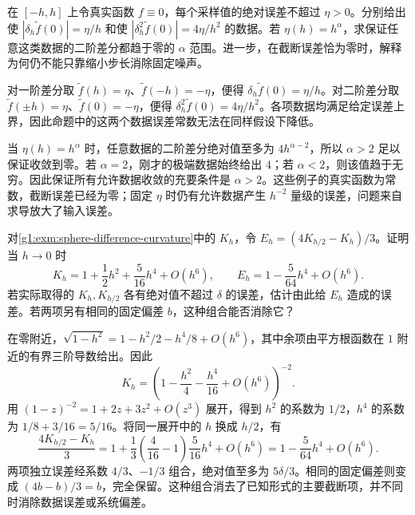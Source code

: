 \begin{exercise}\label{g1:ex:difference-noise-sharpness}
	在 \([-h,h]\) 上令真实函数 \(f\equiv0\)，每个采样值的绝对误差不超过 \(\eta>0\)。分别给出使 \(|\delta_h\widetilde f(0)|=\eta/h\) 和使 \(|\delta_h^2\widetilde f(0)|=4\eta/h^2\) 的数据。若 \(\eta(h)=h^\alpha\)，求保证任意这类数据的二阶差分都趋于零的 \(\alpha\) 范围。进一步，在截断误差恰为零时，解释为何仍不能只靠缩小步长消除固定噪声。
\end{exercise}
\begin{solution}
	对一阶差分取 \(\widetilde f(h)=\eta\)、\(\widetilde f(-h)=-\eta\)，便得 \(\delta_h\widetilde f(0)=\eta/h\)。对二阶差分取 \(\widetilde f(\pm h)=\eta\)、\(\widetilde f(0)=-\eta\)，便得 \(\delta_h^2\widetilde f(0)=4\eta/h^2\)。各项数据均满足给定误差上界，因此命题中的这两个数据误差常数无法在同样假设下降低。

	当 \(\eta(h)=h^\alpha\) 时，任意数据的二阶差分绝对值至多为 \(4h^{\alpha-2}\)，所以 \(\alpha>2\) 足以保证收敛到零。若 \(\alpha=2\)，刚才的极端数据始终给出 \(4\)；若 \(\alpha<2\)，则该值趋于无穷。因此保证所有允许数据收敛的充要条件是 \(\alpha>2\)。这些例子的真实函数为常数，截断误差已经为零；固定 \(\eta\) 时仍有允许数据产生 \(h^{-2}\) 量级的误差，问题来自求导放大了输入误差。
\end{solution}

\begin{exercise}\label{g1:ex:discrete-sphere-extrapolation}
	对\cref{g1:exm:sphere-difference-curvature}中的 \(K_h\)，令 \(E_h=(4K_{h/2}-K_h)/3\)。证明当 \(h\to0\) 时
	\[
		K_h=1+\frac12h^2+\frac5{16}h^4+O(h^6),\qquad
		E_h=1-\frac5{64}h^4+O(h^6).
	\]
	若实际取得的 \(K_h,K_{h/2}\) 各有绝对值不超过 \(\delta\) 的误差，估计由此给 \(E_h\) 造成的误差。若两项另有相同的固定偏差 \(b\)，这种组合能否消除它？
\end{exercise}
\begin{solution}
	在零附近，\(\sqrt{1-h^2}=1-h^2/2-h^4/8+O(h^6)\)，其中余项由平方根函数在 \(1\) 附近的有界三阶导数给出。因此
	\[
		K_h=\left(1-\frac{h^2}4-\frac{h^4}{16}+O(h^6)\right)^{-2}.
	\]
	用 \((1-z)^{-2}=1+2z+3z^2+O(z^3)\) 展开，得到 \(h^2\) 的系数为 \(1/2\)，\(h^4\) 的系数为 \(1/8+3/16=5/16\)。将同一展开中的 \(h\) 换成 \(h/2\)，有
	\[
		\frac{4K_{h/2}-K_h}{3}
		=1+\frac13\left(\frac{4}{16}-1\right)\frac5{16}h^4+O(h^6)
		=1-\frac5{64}h^4+O(h^6).
	\]
	两项独立误差经系数 \(4/3\)、\(-1/3\) 组合，绝对值至多为 \(5\delta/3\)。相同的固定偏差则变成 \((4b-b)/3=b\)，完全保留。这种组合消去了已知形式的主要截断项，并不同时消除数据误差或系统偏差。
\end{solution}

